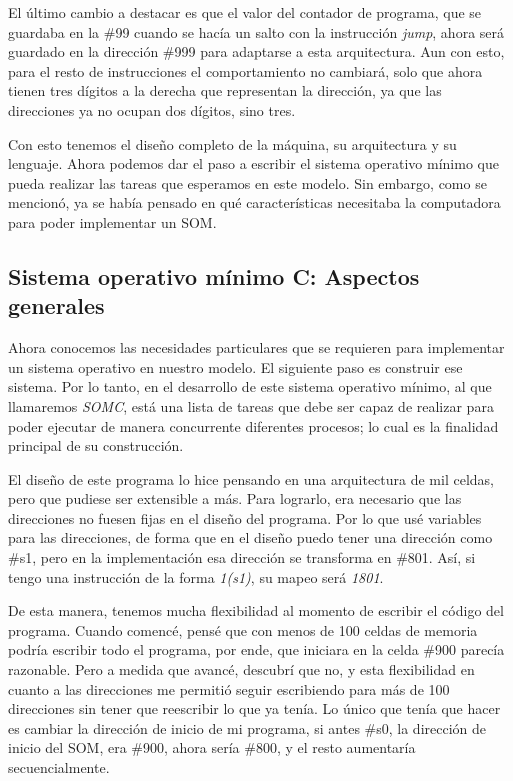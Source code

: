 \documentclass[letterpaper,12pt,oneside]{book}
\begin{document}
		El último cambio a destacar es que el valor del contador de programa, que se guardaba en la \#99 cuando se hacía un salto con la instrucción 
		\textit{jump}, ahora
		será guardado en la dirección \#999 para adaptarse a esta arquitectura. Aun con esto, para el resto de instrucciones
		el comportamiento no cambiará, solo que ahora tienen tres dígitos a la derecha que representan la dirección, ya que las
		direcciones
		ya no ocupan dos dígitos, sino tres.
		
		Con esto tenemos el diseño completo de la máquina, su arquitectura y su lenguaje. Ahora podemos dar el paso a escribir el sistema operativo 
		mínimo que
		pueda realizar las tareas que esperamos en este modelo. Sin embargo, como se mencionó, ya se había pensado en qué características necesitaba la 
		computadora
		para poder implementar un SOM.

		
		\subsection{Sistema operativo mínimo C: Aspectos generales}
		
		Ahora conocemos las necesidades particulares que se requieren para
		implementar un sistema operativo en nuestro modelo. El siguiente paso es construir ese sistema.
		 Por lo tanto, en el desarrollo de este sistema operativo
		mínimo, al que llamaremos \textit{SOMC}, está una lista de tareas que debe ser capaz de realizar para poder ejecutar de manera
		concurrente diferentes procesos; lo cual es la finalidad principal de su construcción.
		
		El diseño de este programa lo hice pensando en una arquitectura de mil celdas, pero que pudiese ser extensible a más. Para lograrlo, era 
		necesario
		que las direcciones no fuesen fijas en el diseño del programa. Por lo que usé variables para las direcciones, de forma que en
		el diseño puedo tener una dirección como \#s1, pero en la implementación esa dirección se transforma en \#801. Así, si tengo una
		instrucción de la forma \textit{1(s1)}, su mapeo será \textit{1801}.
  
        De esta manera, tenemos mucha flexibilidad al momento de escribir
		el código del programa. Cuando comencé, pensé que con menos de 100 celdas de memoria podría escribir todo el programa, por ende, que iniciara
		en la celda \#900 parecía razonable. Pero a medida que avancé,
		descubrí que no, y esta flexibilidad en cuanto a las direcciones me permitió seguir escribiendo para más de 100 direcciones sin tener que reescribir
		lo que ya tenía. Lo único que tenía que hacer es cambiar la dirección de inicio de mi programa, si antes \#s0, la dirección de inicio del SOM,
		era \#900, ahora sería \#800, y el resto aumentaría secuencialmente.
		
\end{document}
